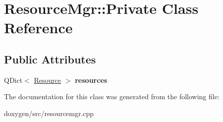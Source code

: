 \hypertarget{class_resource_mgr_1_1_private}{}\section{Resource\+Mgr\+::Private Class Reference}
\label{class_resource_mgr_1_1_private}
\subsection*{Public Attributes}
\begin{DoxyCompactItemize}
\item 
\mbox{\label{class_resource_mgr_1_1_private_adf85c972df9ed3713c659f899fffa9f6}} 
Q\+Dict$<$ \mbox{\hyperlink{struct_resource}{Resource}} $>$ {\bfseries resources}
\end{DoxyCompactItemize}


The documentation for this class was generated from the following file\+:\begin{DoxyCompactItemize}
\item 
doxygen/src/resourcemgr.\+cpp\end{DoxyCompactItemize}
